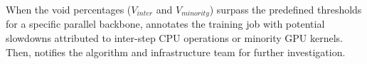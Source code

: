 When the void percentages ($V_{inter}$ and $V_{minority}$) surpass the predefined thresholds for a specific parallel backbone, \sysname{} annotates the training job with potential slowdowns attributed to inter-step CPU operations or minority GPU kernels. Then, \sysname{} notifies the algorithm and infrastructure team for further investigation.

